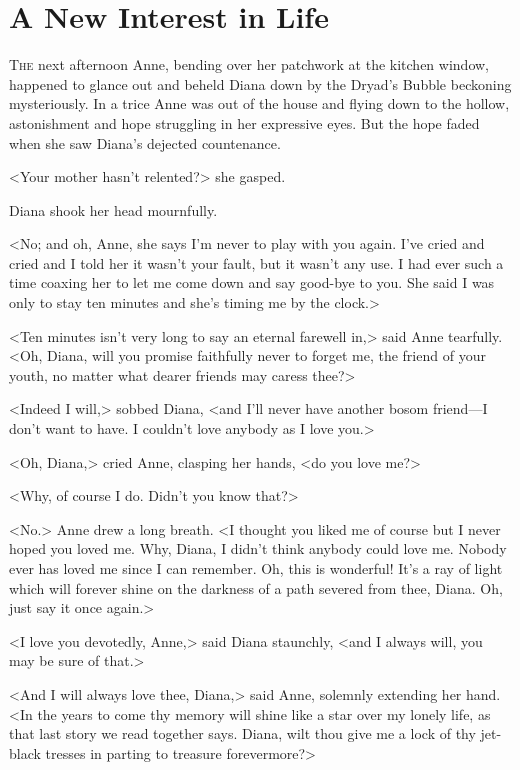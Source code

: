 \chapter{A New Interest in Life}

\lettrine{T}{he} next afternoon Anne, bending over her patchwork at the kitchen window, happened to glance out and beheld Diana down by the Dryad's Bubble beckoning mysteriously. In a trice Anne was out of the house and flying down to the hollow, astonishment and hope struggling in her expressive eyes. But the hope faded when she saw Diana's dejected countenance.

<Your mother hasn't relented?> she gasped.

Diana shook her head mournfully.

<No; and oh, Anne, she says I'm never to play with you again. I've cried and cried and I told her it wasn't your fault, but it wasn't any use. I had ever such a time coaxing her to let me come down and say good-bye to you. She said I was only to stay ten minutes and she's timing me by the clock.>

<Ten minutes isn't very long to say an eternal farewell in,> said Anne tearfully. <Oh, Diana, will you promise faithfully never to forget me, the friend of your youth, no matter what dearer friends may caress thee?>

<Indeed I will,> sobbed Diana, <and I'll never have another bosom friend—I don't want to have. I couldn't love anybody as I love you.>

<Oh, Diana,> cried Anne, clasping her hands, <do you love me?>

<Why, of course I do. Didn't you know that?>

<No.> Anne drew a long breath. <I thought you liked me of course but I never hoped you loved me. Why, Diana, I didn't think anybody could love me. Nobody ever has loved me since I can remember. Oh, this is wonderful! It's a ray of light which will forever shine on the darkness of a path severed from thee, Diana. Oh, just say it once again.>

<I love you devotedly, Anne,> said Diana staunchly, <and I always will, you may be sure of that.>

<And I will always love thee, Diana,> said Anne, solemnly extending her hand. <In the years to come thy memory will shine like a star over my lonely life, as that last story we read together says. Diana, wilt thou give me a lock of thy jet-black tresses in parting to treasure forevermore?>

